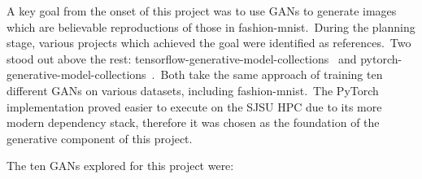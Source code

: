 \documentclass[conference]{IEEEtran}
\begin{document}
    A key goal from the onset of this project was to use GANs to generate images which are believable reproductions of those in fashion-mnist.\ During the planning stage, various projects which achieved the goal were identified as references.\ Two stood out above the rest: tensorflow-generative-model-collections~\cite{tensorflow-generative-model-collections} and pytorch-generative-model-collections~\cite{original-pytorch-generative-model-collections}.\ Both take the same approach of training ten different GANs on various datasets, including fashion-mnist.\ The PyTorch implementation proved easier to execute on the SJSU HPC due to its more modern dependency stack, therefore it was chosen as the foundation of the generative component of this project.

    The ten GANs explored for this project were:
\end{document}
